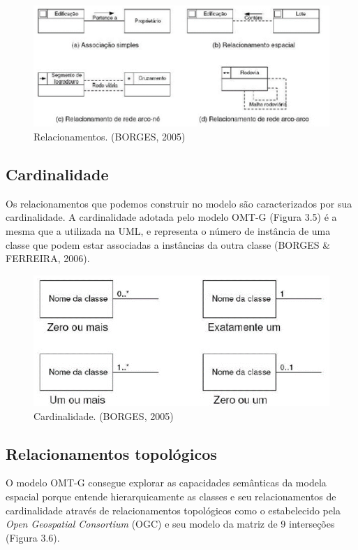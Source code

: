 		\begin{figure} [h]
			\centering
			\includegraphics[width=1\linewidth]{data/relacionamentos}
			\caption{Relacionamentos. (BORGES, 2005)}
			\label{fig:relacionamentos}
		\end{figure}
	
		\subsection{Cardinalidade}
		
		Os relacionamentos que podemos construir no modelo são caracterizados por sua cardinalidade. A cardinalidade adotada pelo modelo OMT-G (Figura 3.5) é a mesma que a utilizada na UML, e representa o número de instância de uma classe que podem estar associadas a instâncias da outra classe (BORGES \& FERREIRA, 2006).
		
		\begin{figure} [h]
			\centering
			\includegraphics[width=1\linewidth]{data/cardinalidade}
			\caption{Cardinalidade. (BORGES, 2005)}
			\label{fig:cardinalidade}
		\end{figure}
		
		\subsection{Relacionamentos topológicos}
		
		O modelo OMT-G consegue explorar as capacidades semânticas da modela espacial porque entende hierarquicamente as classes e seu relacionamentos de cardinalidade através de relacionamentos topológicos como o estabelecido pela \textit{Open Geospatial Consortium} (OGC) e seu modelo da matriz de 9 interseções (Figura 3.6).
		

